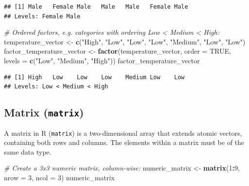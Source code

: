 \documentclass[
]{book}
\newenvironment{Shaded}{\begin{snugshade}}{\end{snugshade}}
\newcommand{\AttributeTok}[1]{\textcolor[rgb]{0.13,0.29,0.53}{#1}}
\newcommand{\CommentTok}[1]{\textcolor[rgb]{0.56,0.35,0.01}{\textit{#1}}}
\newcommand{\ConstantTok}[1]{\textcolor[rgb]{0.56,0.35,0.01}{#1}}
\newcommand{\DecValTok}[1]{\textcolor[rgb]{0.00,0.00,0.81}{#1}}
\newcommand{\FunctionTok}[1]{\textcolor[rgb]{0.13,0.29,0.53}{\textbf{#1}}}
\newcommand{\NormalTok}[1]{#1}
\newcommand{\OtherTok}[1]{\textcolor[rgb]{0.56,0.35,0.01}{#1}}
\newcommand{\SpecialCharTok}[1]{\textcolor[rgb]{0.81,0.36,0.00}{\textbf{#1}}}
\newcommand{\StringTok}[1]{\textcolor[rgb]{0.31,0.60,0.02}{#1}}
\begin{document}
\begin{verbatim}
## [1] Male   Female Male   Male   Male   Female Male  
## Levels: Female Male
\end{verbatim}

\begin{Shaded}
\begin{Highlighting}[]
\CommentTok{\# Ordered factors, e.g. categories with ordering Low \textless{} Medium \textless{} High:}
\NormalTok{temperature\_vector }\OtherTok{\textless{}{-}} \FunctionTok{c}\NormalTok{(}\StringTok{"High"}\NormalTok{, }\StringTok{"Low"}\NormalTok{, }\StringTok{"Low"}\NormalTok{, }\StringTok{"Low"}\NormalTok{, }\StringTok{"Medium"}\NormalTok{, }\StringTok{"Low"}\NormalTok{, }\StringTok{"Low"}\NormalTok{)}
\NormalTok{factor\_temperature\_vector }\OtherTok{\textless{}{-}} \FunctionTok{factor}\NormalTok{(temperature\_vector, }
                                    \AttributeTok{order =} \ConstantTok{TRUE}\NormalTok{, }
                                    \AttributeTok{levels =} \FunctionTok{c}\NormalTok{(}\StringTok{"Low"}\NormalTok{, }\StringTok{"Medium"}\NormalTok{, }\StringTok{"High"}\NormalTok{))}
\NormalTok{factor\_temperature\_vector}
\end{Highlighting}
\end{Shaded}

\begin{verbatim}
## [1] High   Low    Low    Low    Medium Low    Low   
## Levels: Low < Medium < High
\end{verbatim}

\hypertarget{matrix-matrix}{%
\subsection{\texorpdfstring{Matrix (\texttt{matrix})}{Matrix (matrix)}}\label{matrix-matrix}}

A matrix in R (\texttt{matrix}) is a two-dimensional array that extends atomic vectors, containing both rows and columns. The elements within a matrix must be of the same data type.

\begin{Shaded}
\begin{Highlighting}[]
\CommentTok{\# Create a 3x3 numeric matrix, column{-}wise:}
\NormalTok{numeric\_matrix }\OtherTok{\textless{}{-}} \FunctionTok{matrix}\NormalTok{(}\DecValTok{1}\SpecialCharTok{:}\DecValTok{9}\NormalTok{, }\AttributeTok{nrow =} \DecValTok{3}\NormalTok{, }\AttributeTok{ncol =} \DecValTok{3}\NormalTok{)}
\NormalTok{numeric\_matrix}
\end{Highlighting}
\end{Shaded}
\end{document}
